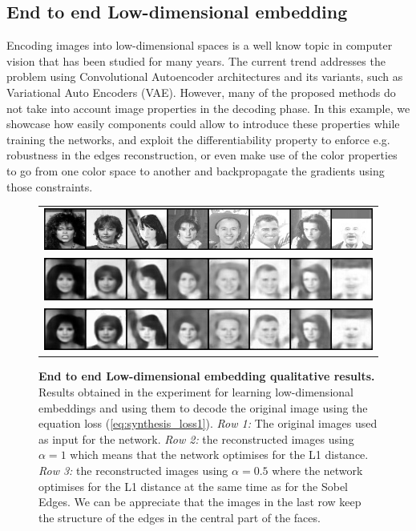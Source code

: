 \subsection{End to end Low-dimensional embedding}
\label{section:use_cases:image_reconstruction}

Encoding images into low-dimensional spaces is a well know topic in computer vision that has been studied for many years. The current trend  addresses the problem using  Convolutional Autoencoder architectures and  its   variants, such as Variational Auto Encoders (VAE). However, many of the proposed methods do not take into account image properties in the decoding phase. In this example, we  showcase how easily \lib{} components could allow to introduce these properties while training the networks, and exploit the differentiability property to enforce e.g. robustness in the edges reconstruction, or even make use of the color properties to go from one color space to another and backpropagate the gradients using those constraints.

\begin{figure}
    \begin{center}
        \begin{tabular}{c}
        \includegraphics[width=\textwidth]{main/chapter03/data/synthesis/celeb_gray.jpg} \\
        \includegraphics[width=\textwidth]{main/chapter03/data/synthesis/celeb_gray_l1.jpg} \\
        \includegraphics[width=\textwidth]{main/chapter03/data/synthesis/celeb_gray_l1+sobel.jpg} \\
        \end{tabular}
    \end{center}
    \caption[End to end Low-dimensional embedding qualitative results]{\textbf{End to end Low-dimensional embedding qualitative results.} Results obtained in the experiment for learning low-dimensional embeddings and using them to decode the original image using the equation loss (\ref{eq:synthesis_loss1}). \textit{Row 1:} The original images used as input for the network. \textit{Row 2:} the reconstructed images using $\alpha = 1$ which means that the network optimises for the L1 distance. \textit{Row 3:} the reconstructed images using $\alpha = 0.5$ where the network optimises for the L1 distance at the same time as for the Sobel Edges. We can be appreciate that the images in the last row keep the structure of the edges in the central part of the faces.}
    \label{fig:synthesis}
\end{figure}

